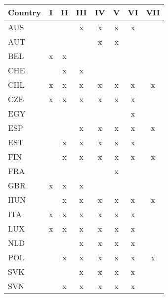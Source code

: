 \begin{tabular}{lccccccc}
Country & I & II & III & IV & V & VI & VII \\  \hline 
AUS&&&x&x&x&x&\\
AUT&&&&x&x&&\\
BEL&x&x&&&&&\\
CHE&&x&x&&&&\\
CHL&x&x&x&x&x&x&x\\
CZE&x&x&x&x&x&x&\\
EGY&&&&&&x&\\
ESP&&&x&x&x&x&x\\
EST&&x&x&x&x&x&\\
FIN&&x&x&x&x&x&x\\
FRA&&&&&x&&\\
GBR&x&x&x&&&&\\
HUN&&x&x&x&x&x&x\\
ITA&x&x&x&x&x&x&\\
LUX&x&x&x&x&x&x&\\
NLD&&&x&x&x&x&\\
POL&&x&x&x&x&x&x\\
SVK&&&x&x&x&x&\\
SVN&&x&x&x&x&x&\\
\hline \end{tabular}
